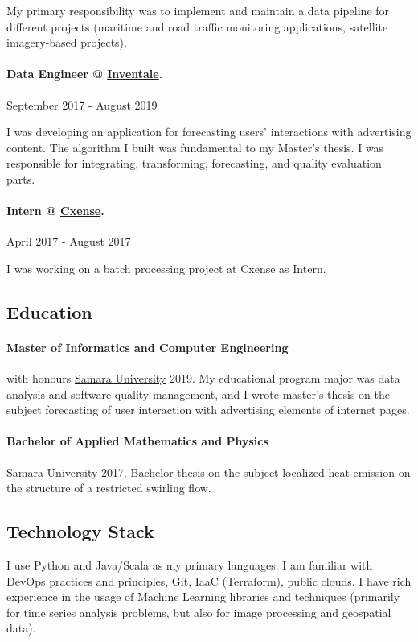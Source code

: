 \documentclass[10pt]{article}
\begin{document}
My primary responsibility was to implement and maintain a data pipeline for
different projects (maritime and road traffic monitoring applications,
satellite imagery-based projects).

\paragraph*{Data Engineer @ \href{https://inventale.com/en/Inventale}{Inventale}.} September 2017 - August 2019

I was developing an application for forecasting users' interactions with
advertising content.
The algorithm I built was fundamental to my Master's thesis.
I was responsible for integrating, transforming, forecasting, and quality evaluation parts.

\paragraph*{Intern @ \href{https://resources.piano.io/articles/piano-acquires-cxense-expanding-the-possibilities-of-the-platform-with-data-management-and-intelligent-personalization-capabilities}{Cxense}.} April 2017 - August 2017

I was working on a batch processing project at Cxense as Intern.

\subsection*{Education}

\paragraph*{Master of Informatics and Computer Engineering} with honours \href{https://ssau.ru/english}{Samara University} 2019.
My educational program major was data analysis and software quality management, and I wrote
master's thesis on the subject forecasting of user interaction with advertising elements of internet pages.

\paragraph*{Bachelor of Applied Mathematics and Physics} \href{https://ssau.ru/english}{Samara University} 2017.
Bachelor thesis on the subject localized heat emission on the structure of a restricted swirling flow.

\subsection*{Technology Stack}

I use Python and Java/Scala as my primary languages.
I am familiar with DevOps practices and principles, Git, IaaC (Terraform), public clouds.
I have rich experience in the usage of Machine Learning libraries and techniques (primarily for time series analysis
problems, but also for image processing and geospatial data).
\end{document}
